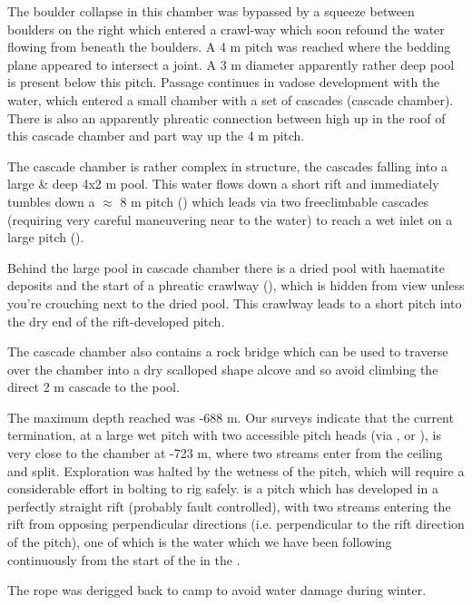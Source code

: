 The boulder collapse in this chamber was bypassed by a squeeze between
boulders on the right which entered a crawl-way which soon refound the
water flowing from beneath the boulders. A 4 m pitch was reached where
the bedding plane appeared to intersect a joint. A 3 m diameter
apparently rather deep pool is present below this pitch. Passage
continues in vadose development with the water, which entered a small
chamber with a set of cascades (cascade chamber). There is also an
apparently phreatic connection between high up in the roof of this
cascade chamber and part way up the 4 m pitch.

The cascade chamber is rather complex in structure, the cascades falling
into a large \& deep 4x2 m pool. This water flows down a short rift and
immediately tumbles down a $\approx$ 8 m pitch ()
which leads via two freeclimbable cascades (requiring very careful
maneuvering near to the water) to reach a wet inlet on a large pitch
().

Behind the large pool in cascade chamber there is a dried pool with
haematite deposits and the start of a phreatic crawlway (), which is hidden from view unless you're crouching next to the
dried pool. This crawlway leads to a short pitch into the dry end of the
rift-developed  pitch.

The cascade chamber also contains a rock bridge which can be used to traverse over the chamber into a dry scalloped shape alcove and so avoid climbing the direct 2 m cascade to the pool.

The maximum depth reached was -688 m. Our surveys indicate that the
current termination, at a large wet pitch with two accessible pitch
heads (via , or ), is very close to
the  chamber at -723 m, where two streams enter from the
ceiling and split. Exploration was halted by the wetness of the pitch,
which will require a considerable effort in bolting to rig safely.
 is a pitch which has developed in a perfectly
straight rift (probably fault controlled), with two streams entering the
rift from opposing perpendicular directions (i.e. perpendicular to the
rift direction of the pitch), one of which is the  water
which we have been following continuously from the start of the
 in the .

The  rope was derigged back to camp to avoid water
damage during winter.

